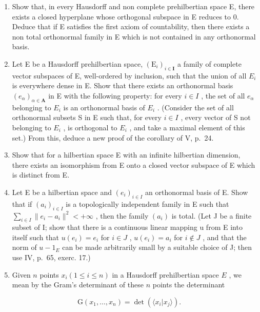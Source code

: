 \begin{enumerate}
\def\labelenumi{\arabic{enumi})}
\setcounter{enumi}{2}
\item
  Show that, in every Hausdorff and non complete prehilbertian space E, there exists a closed hyperplane whose orthogonal subspace in E reduces to 0. Deduce that if E satisfies the first axiom of countability, then there exists a non total orthonormal family in E which is not contained in any orthonormal basis.
\item
  Let E be a Hausdorff prehilbertian space, \((\mathrm{E}_{i})_{i\in\mathbf{I}}\) a family of complete vector subspaces of E, well-ordered by inclusion, such that the union of all \(E_{i}\) is everywhere dense in E. Show that there exists an orthonormal basis \((e_{\alpha})_{\alpha\in\mathbf{A}}\) in E with the following property: for every \(i\in I\) , the set of all \(e_{\alpha}\) belonging to \(E_{i}\) is an orthonormal basis of \(E_{i}\) . (Consider the set of all orthonormal subsets S in E such that, for every \(i\in I\) , every vector of S not belonging to \(E_{i}\) , is orthogonal to \(E_{i}\) , and take a maximal element of this set.) From this, deduce a new proof of the corollary of V, p.~24.
\item
  Show that for a hilbertian space E with an infinite hilbertian dimension, there exists an isomorphism from E onto a closed vector subspace of E which is distinct from E.
\item
  Let E be a hilbertian space and \((e_{i})_{i\in I}\) an orthonormal basis of E. Show that if \((a_{i})_{i\in I}\) is a topologically independent family in E such that \(\sum_{i\in I}\|e_{i}-a_{i}\|^{2}<+\infty\) , then the family \((a_{i})\) is total. (Let J be a finite subset of I; show that there is a continuous linear mapping u from E into itself such that \(u(e_{i})=e_{i}\) for \(i\in J\) , \(u(e_{i})=a_{i}\) for \(i\notin J\) , and that the norm of \(u-1_{E}\) can be made arbitrarily small by a suitable choice of J; then use IV, p.~65, exerc. 17.)
\item
  Given \(n\) points \(x_{i} (1 \leqslant i \leqslant n)\) in a Hausdorff prehilbertian space \(E\) , we mean by the Gram's determinant of these \(n\) points the determinant
\end{enumerate}

\[
\mathrm{G} (x _ {1}, \dots , x _ {n}) = \det (\langle x _ {i} | x _ {j} \rangle).
\]

